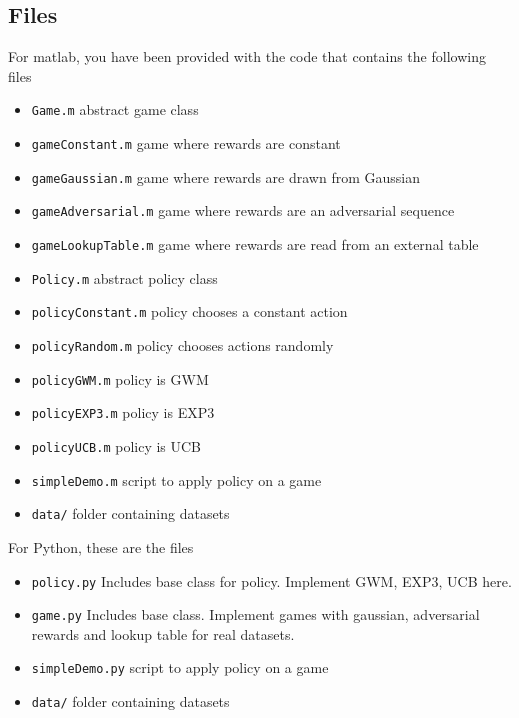 \documentclass{article}
\begin{document}
\subsection{Files}

For matlab, you have been provided with the code that contains the following files

\begin{itemize}
\item \texttt{Game.m} \textemdash abstract game class 
\item \texttt{gameConstant.m} \textemdash game where rewards are constant
\item \texttt{gameGaussian.m} \textemdash game where rewards are drawn from Gaussian
\item \texttt{gameAdversarial.m} \textemdash game where rewards are an adversarial sequence
\item \texttt{gameLookupTable.m} \textemdash game where rewards are read from an external table
\item \texttt{Policy.m} \textemdash abstract policy class 
\item \texttt{policyConstant.m} \textemdash policy chooses a constant action
\item \texttt{policyRandom.m} \textemdash policy chooses actions randomly
\item \texttt{policyGWM.m} \textemdash policy is GWM
\item \texttt{policyEXP3.m} \textemdash policy is EXP3
\item \texttt{policyUCB.m} \textemdash policy is UCB
\item \texttt{simpleDemo.m} \textemdash script to apply policy on a game
\item \texttt{data/} \textemdash folder containing datasets
\end{itemize}


For Python, these are the files

\begin{itemize}
\item \texttt{policy.py} \textemdash Includes base class for policy. Implement GWM, EXP3, UCB here. 
\item \texttt{game.py} \textemdash Includes base class. Implement games with gaussian, adversarial rewards and lookup table for real datasets.
\item \texttt{simpleDemo.py} \textemdash script to apply policy on a game
\item \texttt{data/} \textemdash folder containing datasets
\end{itemize}
\end{document}
